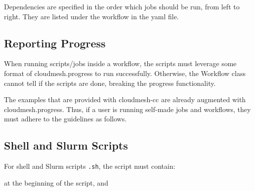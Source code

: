 Dependencies are specified in the order which jobs should be run, from
left to right. They are listed under the workflow in the yaml file.

\begin{Shaded}
\begin{Highlighting}[]
    \ExtensionTok{{-}}
\end{Highlighting}
\end{Shaded}

\subsection{Reporting Progress}\label{reporting-progress}

When running scripts/jobs inside a workflow, the scripts must leverage
some format of cloudmesh.progress to run successfully. Otherwise, the
Workflow class cannot tell if the scripts are done, breaking the
progress functionality.

The examples that are provided with cloudmesh-cc are already augmented
with cloudmesh.progress. Thus, if a user is running self-made jobs and
workflows, they must adhere to the guidelines as follows.

\subsection{Shell and Slurm Scripts}\label{shell-and-slurm-scripts}

For shell and Slurm scripts \texttt{.sh}, the script must contain:

\begin{Shaded}
\begin{Highlighting}[]
 \VariableTok{$$}
\end{Highlighting}
\end{Shaded}

at the beginning of the script, and

\begin{Shaded}
\begin{Highlighting}[]
 \VariableTok{$$}
\end{Highlighting}
\end{Shaded}

